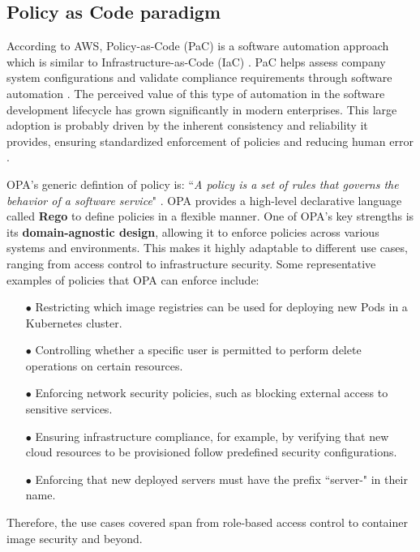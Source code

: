 \subsection{Policy as Code paradigm}

According to AWS, Policy-as-Code (PaC) is a software automation approach which is similar to Infrastructure-as-Code (IaC) \cite{pac_aws}. PaC helps assess company system configurations and validate compliance requirements through software automation \cite{pac_aws}. The perceived value of this type of automation in the software development lifecycle has grown significantly in modern enterprises. This large adoption is probably driven by the inherent consistency and reliability it provides, ensuring standardized enforcement of policies and reducing human error \cite{pac_aws}.

OPA's generic defintion of policy is: ``\textit{A policy is a set of rules that governs the behavior of a software service}" \cite{opa_philosophy}. OPA provides a high-level declarative language called \textbf{Rego} to define policies in a flexible manner. One of OPA's key strengths is its \textbf{domain-agnostic design}, allowing it to enforce policies across various systems and environments. This makes it highly adaptable to different use cases, ranging from access control to infrastructure security. Some representative examples of policies that OPA can enforce include:

\begin{itemize}[itemsep=0.2pt, topsep=1pt] \item[$\bullet$] Restricting which image registries can be used for deploying new Pods in a Kubernetes cluster.
\item[$\bullet$] Controlling whether a specific user is permitted to perform delete operations on certain resources.
\item[$\bullet$] Enforcing network security policies, such as blocking external access to sensitive services.
\item[$\bullet$] Ensuring infrastructure compliance, for example, by verifying that new cloud resources to be provisioned follow predefined security configurations.
\item[$\bullet$] Enforcing that new deployed servers must have the prefix ``server-" in their name.
\end{itemize}
Therefore, the use cases covered span from role-based access control to container image security and beyond.
\newline


